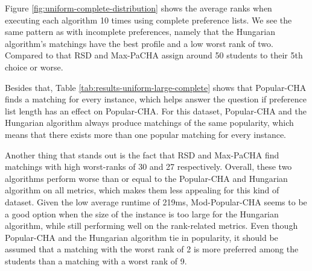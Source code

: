 Figure \ref{fig:uniform-complete-distribution} shows the average ranks when executing each algorithm 10 times using complete preference lists. We see the same pattern as with incomplete preferences, namely that the Hungarian algorithm's matchings have the best profile and a low worst rank of two. Compared to that RSD and Max-PaCHA assign around 50 students to their 5th choice or worse.

Besides that, Table \ref{tab:results-uniform-large-complete} shows that Popular-CHA finds a matching for every instance, which helps answer the question if preference list length has an effect on Popular-CHA. For this dataset, Popular-CHA and the Hungarian algorithm always produce matchings of the same popularity, which means that there exists more than one popular matching for every instance. 

\begin{table}[h!]
  \centering
  \caption{Average results for large uniform dataset with complete preferences.}
  \label{tab:results-uniform-large-complete}
\end{table}

Another thing that stands out is the fact that RSD and Max-PaCHA find matchings with high worst-ranks of 30 and 27 respectively. Overall, these two algorithms perform worse than or equal to the Popular-CHA and Hungarian algorithm on all metrics, which makes them less appealing for this kind of dataset. Given the low average runtime of 219ms, Mod-Popular-CHA seems to be a good option when the size of the instance is too large for the Hungarian algorithm, while still performing well on the rank-related metrics. Even though Popular-CHA and the Hungarian algorithm tie in popularity, it should be assumed that a matching with the worst rank of 2 is more preferred among the students than a matching with a worst rank of 9. 

